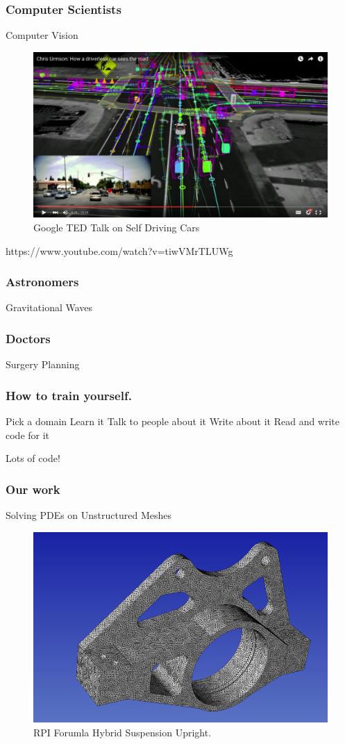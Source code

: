 \documentclass{beamer}
\begin{document}
\begin{frame}
  \frametitle{Computer Scientists}
  \center Computer Vision
  \begin{figure} \centering 
    \includegraphics[width=.8\textwidth]{figs/compsci/google-comp-vision.png}
    \caption{Google TED Talk on Self Driving Cars}
  \end{figure}
  {\small https://www.youtube.com/watch?v=tiwVMrTLUWg}
\end{frame}

\begin{frame}
  \frametitle{Astronomers}
  \center Gravitational Waves
\end{frame}

\begin{frame}
  \frametitle{Doctors}
  \center Surgery Planning
\end{frame}

\begin{frame}
  \frametitle{How to train yourself.}
  \center Pick a domain
  \center Learn it
  \center Talk to people about it
  \center Write about it
  \center Read and write code for it
\end{frame}

\begin{frame}
  \center Lots of code!
\end{frame}

\begin{frame}
  \frametitle{Our work}
  \center Solving PDEs on Unstructured Meshes
   \begin{figure} \centering 
     \includegraphics[width=.8\textwidth]{figs/mesh/upright.png}
     \caption{RPI Forumla Hybrid Suspension Upright.}
  \end{figure}
\end{frame}
\end{document}
